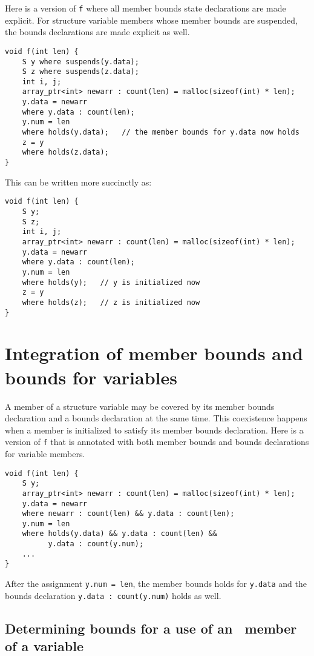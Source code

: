 Here is a version of \texttt{f} where all member bounds state declarations are
made explicit. For structure variable members whose member bounds are
suspended, the bounds declarations are made explicit as well.

\begin{lstlisting}
void f(int len) {
    S y where suspends(y.data);
    S z where suspends(z.data);
    int i, j;
    array_ptr<int> newarr : count(len) = malloc(sizeof(int) * len);
    y.data = newarr
    where y.data : count(len);
    y.num = len
    where holds(y.data);   // the member bounds for y.data now holds
    z = y
    where holds(z.data);
}
\end{lstlisting}

This can be written more succinctly as:

\begin{lstlisting}
void f(int len) {
    S y;
    S z;
    int i, j;
    array_ptr<int> newarr : count(len) = malloc(sizeof(int) * len);
    y.data = newarr
    where y.data : count(len);
    y.num = len
    where holds(y);   // y is initialized now
    z = y
    where holds(z);   // z is initialized now
}
\end{lstlisting}

\section{Integration of member bounds and bounds for variables}

A member of a structure variable may be covered by its member bounds
declaration and a bounds declaration at the same time. This coexistence
happens when a member is initialized to satisfy its member bounds
declaration. Here is a version of \texttt{f} that is annotated with both member
bounds and bounds declarations for variable members.
\begin{lstlisting}
void f(int len) {
    S y;
    array_ptr<int> newarr : count(len) = malloc(sizeof(int) * len);
    y.data = newarr
    where newarr : count(len) && y.data : count(len);
    y.num = len
    where holds(y.data) && y.data : count(len) && 
          y.data : count(y.num);
    ...
}
\end{lstlisting}

After the assignment \texttt{y.num = len}, the member bounds holds for
\texttt{y.data} and the bounds declaration \texttt{y.data : count(y.num)}
holds as well.

\subsection{Determining bounds for a use of an \arrayptr\ member of a variable}
\label{section:determining-variable-member-bounds}

